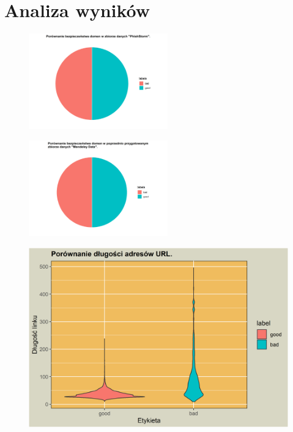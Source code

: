 \documentclass{beamer}
\begin{document}
\section{Analiza wyników}
\begin{frame}
	\begin{figure}[h]
		\begin{minipage}[l]{6cm}
			\includegraphics[width=6cm]{../images/plot_1}\
		\end{minipage}
		\begin{minipage}[l]{6cm}
			\centering
			\includegraphics[width=6cm]{../images/plot_2}
		\end{minipage}
	\end{figure}
\end{frame}
\begin{frame}
\begin{figure}
	\centering
	\includegraphics[width=1\linewidth]{../images/plot_3}
\end{figure}
\end{frame}
\end{document}
